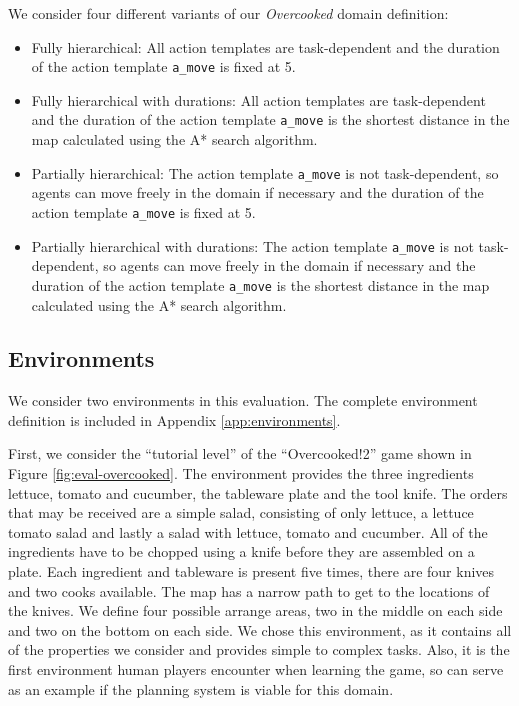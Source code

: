We consider four different variants of our \textit{Overcooked} domain definition:
\begin{itemize}
  \item Fully hierarchical: All action templates are task-dependent and the duration of the action template \verb|a_move| is fixed at 5.
  \item Fully hierarchical with durations: All action templates are task-dependent and the duration of the action template \verb|a_move| is the shortest distance in the map calculated using the A* search algorithm. 
  \item Partially hierarchical: The action template \verb|a_move| is not task-dependent, so agents can move freely in the domain if necessary and the duration of the action template \verb|a_move| is fixed at 5.
  \item Partially hierarchical with durations: The action template \verb|a_move| is not task-dependent, so agents can move freely in the domain if necessary and the duration of the action template \verb|a_move| is the shortest distance in the map calculated using the A* search algorithm. 
\end{itemize}






\subsection{Environments}

We consider two environments in this evaluation.
The complete environment definition is included in Appendix \ref{app:environments}.



First, we consider the ``tutorial level'' of the ``Overcooked!2'' game shown in Figure \ref{fig:eval-overcooked}.
The environment provides the three ingredients lettuce, tomato and cucumber, the tableware plate and the tool knife.
The orders that may be received are a simple salad, consisting of only lettuce, a lettuce tomato salad and lastly a salad with lettuce, tomato and cucumber.
All of the ingredients have to be chopped using a knife before they are assembled on a plate.
Each ingredient and tableware is present five times, there are four knives and two cooks available.
The map has a narrow path to get to the locations of the knives.
We define four possible arrange areas, two in the middle on each side and two on the bottom on each side.
We chose this environment, as it contains all of the properties we consider and provides simple to complex tasks.
Also, it is the first environment human players encounter when learning the game, so can serve as an example if the planning system is viable for this domain.

